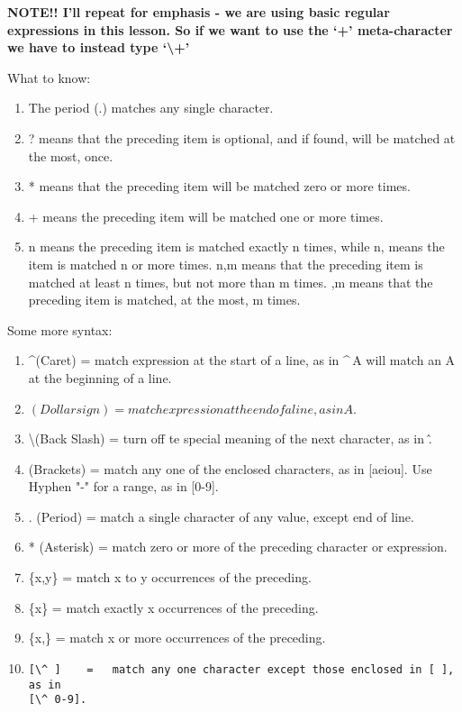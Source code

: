 \documentclass[10pt]{article}
\begin{document}
{\LARGE\textbf{NOTE!! I'll repeat for emphasis - we are using basic regular
expressions in this lesson. So if we want to use the `+' meta-character we have
to instead type `\textbackslash+'}}

What to know:
\begin{enumerate}
\item The period (.) matches any single character.
\item ? means that the preceding item is optional, and if found, will be matched at the most, once.
\item * means that the preceding item will be matched zero or more times.
\item + means the preceding item will be matched one or more times.
\item {n} means the preceding item is matched exactly n times, while {n,} means the item is matched n or more times. {n,m} means that the preceding item is matched at least n times, but not more than m times. {,m} means that the preceding item is matched, at the most, m times.
\end{enumerate}

Some more syntax:
\begin{enumerate}
\item \textasciicircum (Caret)   =   match expression at the start of a line, as
in \textasciicircum\,A will match an A at the beginning of a line.
\item $ (Dollar sign)    =   match expression at the end of a line, as in A$.
\item \textbackslash (Back Slash)  =   turn off te special meaning of the next character, as in \^.
\item [ ] (Brackets)  =   match any one of the enclosed characters, as in [aeiou]. Use Hyphen "-" for a range, as in [0-9].
\item . (Period)  =   match a single character of any value, except end of line.
\item * (Asterisk)    =   match zero or more of the preceding character or expression.
\item \{x,y\} =   match x to y occurrences of the preceding.
\item \{x\}   =   match exactly x occurrences of the preceding.
\item  \{x,\}  =   match x or more occurrences of the preceding.
\item \begin{verbatim}[\^ ]    =   match any one character except those enclosed in [ ], as in
[\^ 0-9].\end{verbatim}
\end{enumerate}
\end{document}
